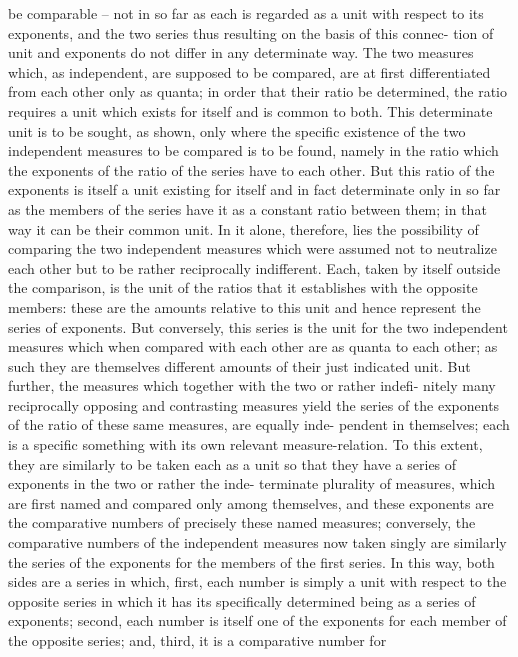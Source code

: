 be comparable – not in so far as each is regarded as a unit with respect to
its exponents, and the two series thus resulting on the basis of this connec-
tion of unit and exponents do not differ in any determinate way. The two
measures which, as independent, are supposed to be compared, are at first
differentiated from each other only as quanta; in order that their ratio be
determined, the ratio requires a unit which exists for itself and is common
to both. This determinate unit is to be sought, as shown, only where the
specific existence of the two independent measures to be compared is to
be found, namely in the ratio which the exponents of the ratio of the
series have to each other. But this ratio of the exponents is itself a unit
existing for itself and in fact determinate only in so far as the members of
the series have it as a constant ratio between them; in that way it can be
their common unit. In it alone, therefore, lies the possibility of comparing
the two independent measures which were assumed not to neutralize each
other but to be rather reciprocally indifferent. Each, taken by itself outside
the comparison, is the unit of the ratios that it establishes with the opposite
members: these are the amounts relative to this unit and hence represent
the series of exponents. But conversely, this series is the unit for the two
independent measures which when compared with each other are as quanta
to each other; as such they are themselves different amounts of their just
indicated unit.
But further, the measures which together with the two or rather indefi-
nitely many reciprocally opposing and contrasting measures yield the series
of the exponents of the ratio of these same measures, are equally inde-
pendent in themselves; each is a specific something with its own relevant
measure-relation. To this extent, they are similarly to be taken each as a
unit so that they have a series of exponents in the two or rather the inde-
terminate plurality of measures, which are first named and compared only
among themselves, and these exponents are the comparative numbers of
precisely these named measures; conversely, the comparative numbers of
the independent measures now taken singly are similarly the series of the
exponents for the members of the first series. In this way, both sides are
a series in which, first, each number is simply a unit with respect to the
opposite series in which it has its specifically determined being as a series
of exponents; second, each number is itself one of the exponents for each
member of the opposite series; and, third, it is a comparative number for
